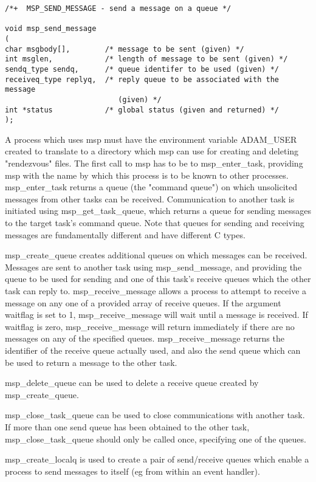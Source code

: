 \begin{verbatim}
/*+  MSP_SEND_MESSAGE - send a message on a queue */

void msp_send_message
(
char msgbody[],        /* message to be sent (given) */
int msglen,            /* length of message to be sent (given) */
sendq_type sendq,      /* queue identifer to be used (given) */
receiveq_type replyq,  /* reply queue to be associated with the message 
                          (given) */
int *status            /* global status (given and returned) */
);

\end{verbatim}

A process which uses msp must have the environment variable ADAM\_USER
created to translate to a directory which msp can use for creating and
deleting "rendezvous" files. The first call to msp has to be to
msp\_enter\_task, providing msp with the name by which this process is to
be known to other processes. msp\_enter\_task returns a queue (the "command
queue") on which unsolicited messages from other tasks can be received.
Communication to another task is initiated using msp\_get\_task\_queue,
which returns a queue for sending messages to the target task's command
queue. Note that queues for sending and receiving messages are
fundamentally different and have different C types.

msp\_create\_queue creates additional queues on which messages can be
received. Messages are sent to another task using msp\_send\_message, and
providing the queue to be used for sending and one of this task's receive
queues which the other task can reply to. msp\_receive\_message allows a
process to attempt to receive a message on any one of a provided array of
receive queues. If the argument waitflag is set to 1, msp\_receive\_message
will wait until a message is received. If waitflag is zero,
msp\_receive\_message will return immediately if there are no messages on
any of the specified queues. msp\_receive\_message returns the identifier
of the receive queue actually used, and also the send queue which can be
used to return a message to the other task.

msp\_delete\_queue can be used to delete a receive queue created by
msp\_create\_queue.

msp\_close\_task\_queue can be used to close communications with another
task. If more than one send queue has been obtained to the other task,
msp\_close\_task\_queue should only be called once, specifying one of the
queues.

msp\_create\_localq is used to create a pair of send/receive queues which
enable a process to send messages to itself (eg from within an event
handler).


